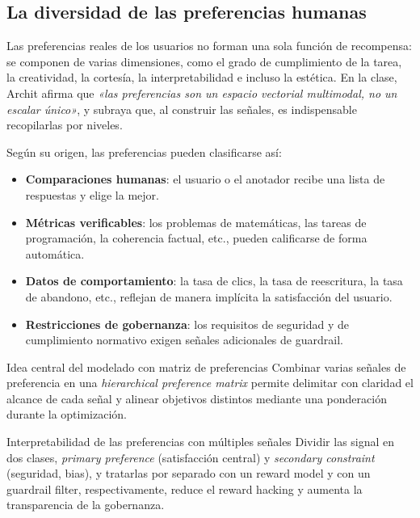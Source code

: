 \documentclass[a4paper]{article}
\begin{document}
\subsection{La diversidad de las preferencias humanas}

Las preferencias reales de los usuarios no forman una sola función de recompensa: se componen de varias dimensiones, como el grado de cumplimiento de la tarea, la creatividad, la cortesía, la interpretabilidad e incluso la estética. En la clase, Archit afirma que \textit{«las preferencias son un espacio vectorial multimodal, no un escalar único»}, y subraya que, al construir las señales, es indispensable recopilarlas por niveles.

Según su origen, las preferencias pueden clasificarse así:
\begin{itemize}
    \item \textbf{Comparaciones humanas}: el usuario o el anotador recibe una lista de respuestas y elige la mejor.
    \item \textbf{Métricas verificables}: los problemas de matemáticas, las tareas de programación, la coherencia factual, etc., pueden calificarse de forma automática.
    \item \textbf{Datos de comportamiento}: la tasa de clics, la tasa de reescritura, la tasa de abandono, etc., reflejan de manera implícita la satisfacción del usuario.
    \item \textbf{Restricciones de gobernanza}: los requisitos de seguridad y de cumplimiento normativo exigen señales adicionales de guardrail.
\end{itemize}

\begin{knowledgebox}{Idea central del modelado con matriz de preferencias}
Combinar varias señales de preferencia en una \textit{hierarchical preference matrix} permite delimitar con claridad el alcance de cada señal y alinear objetivos distintos mediante una ponderación durante la optimización.
\end{knowledgebox}

\begin{importantbox}{Interpretabilidad de las preferencias con múltiples señales}
Dividir las signal en dos clases, \textit{primary preference} (satisfacción central) y \textit{secondary constraint} (seguridad, bias), y tratarlas por separado con un reward model y con un guardrail filter, respectivamente, reduce el reward hacking y aumenta la transparencia de la gobernanza.
\end{importantbox}
\end{document}
